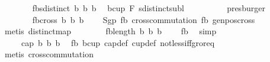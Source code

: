 \begin{isabellebody}
\ \ \ \ \ \ \isamarkupfalse%
\ fb{}{\isacharcolon}{\kern0pt}{\isachardoublequoteopen}sdistinct\ {\isacharbrackleft}{\kern0pt}b{}{\isacharcomma}{\kern0pt}\ b{}{\isacharcomma}{\kern0pt}\ b{}{\isacharbrackright}{\kern0pt}{\isachardoublequoteclose}\ \isamarkupfalse%
\ bcup{\isacharparenleft}{\kern0pt}{}{\isacharparenright}{\kern0pt}\ F{}\ sdistinct{\isacharunderscore}{\kern0pt}subl\isanewline
\ \ \ \ \ \ \ \ \isamarkupfalse%
\ presburger\isanewline
\ \ \ \ \ \ \isanewline
\ \ \ \ \ \ \isamarkupfalse%
\ fb{}{\isacharcolon}{\kern0pt}{\isachardoublequoteopen}cross{}\ b{}\ b{}\ b{}\ {\isasymnoteq}\ {}{\isachardoublequoteclose}\ \isamarkupfalse%
\ S{\isacharunderscore}{\kern0pt}gp\ fb{}\ cross{}{\isacharunderscore}{\kern0pt}commutation{\isacharunderscore}{\kern0pt}{}{}\ fb{}\ genpos{\isacharunderscore}{\kern0pt}cross{}\ \isamarkupfalse%
\ {\isacharparenleft}{\kern0pt}metis\ distinct{\isacharunderscore}{\kern0pt}map{\isacharparenright}{\kern0pt}\isanewline
\ \ \ \ \ \ \isamarkupfalse%
\ fb{}{\isacharcolon}{\kern0pt}{\isachardoublequoteopen}length\ {\isacharbrackleft}{\kern0pt}b{}{\isacharcomma}{\kern0pt}\ b{}{\isacharcomma}{\kern0pt}\ b{}{\isacharbrackright}{\kern0pt}\ {\isacharequal}{\kern0pt}\ {}{\isachardoublequoteclose}\ \isamarkupfalse%
\ fb{}\ \isamarkupfalse%
\ simp\isanewline
\ \ \ \ \ \ \isamarkupfalse%
\ \ \ \ \ {\isachardoublequoteopen}cap{}\ b{}\ b{}\ b{}{\isachardoublequoteclose}\ \isamarkupfalse%
\ fb{}\ bcup{\isacharparenleft}{\kern0pt}{}{\isacharparenright}{\kern0pt}\ cap{}{\isacharunderscore}{\kern0pt}def\ cup{}{\isacharunderscore}{\kern0pt}def\ not{\isacharunderscore}{\kern0pt}less{\isacharunderscore}{\kern0pt}iff{\isacharunderscore}{\kern0pt}gr{\isacharunderscore}{\kern0pt}or{\isacharunderscore}{\kern0pt}eq\isanewline
\ \ \ \ \ \ \ \ \isamarkupfalse%
\ {\isacharparenleft}{\kern0pt}metis\ cross{}{\isacharunderscore}{\kern0pt}commutation{\isacharunderscore}{\kern0pt}{}{}{\isacharparenright}{\kern0pt}\isanewline

\end{isabellebody}
